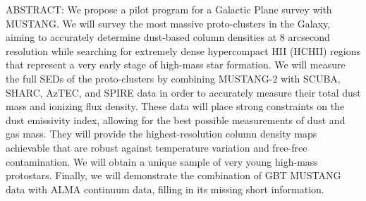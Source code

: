 \documentclass[11pt,preprint]{aastex_nofoot}
\begin{document}
ABSTRACT:
We propose a pilot program for a Galactic Plane survey with MUSTANG.  We will
survey the most massive proto-clusters in the Galaxy, aiming to accurately
determine dust-based column densities at 8 arcsecond resolution while searching
for extremely dense hypercompact HII (HCHII) regions that represent a very
early stage of high-mass star formation.  We will measure the full SEDs of the
proto-clusters by combining MUSTANG-2 with SCUBA, SHARC, AzTEC, and SPIRE data in
order to accurately measure their total dust mass and ionizing flux
density. These data will place strong constraints on the dust emissivity index,
allowing for the best possible measurements of dust and gas mass. 
They will provide the highest-resolution column density maps achievable that
are robust against temperature variation and free-free contamination.
We will obtain a unique sample of very young high-mass protostars.  Finally,
we will demonstrate the combination of GBT MUSTANG data with ALMA continuum
data, filling in its missing short information.
\end{document}
